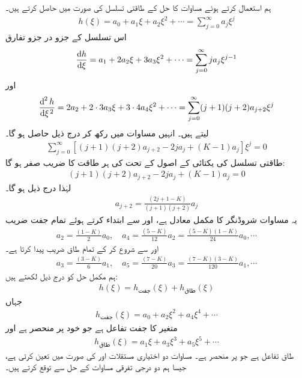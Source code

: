 ہم   استعمال کرتے ہوئے مساوات  کا حل  کے طاقتی تسلسل کی صورت میں حاصل کرتے ہیں۔ 
\begin{align}
h(\xi)=a_{0}+a_{1}\xi+a_{2}\xi^{2}+\cdots = \sum_{j=0}^{\infty}a_{j}\xi^{j}
\end{align}
 اس تسلسل کے جزو در جزو تفارق
\begin{align*}
\frac{\dif{h}}{\dif{\xi}}=a_{1}+2a_{2}\xi+3a_{3}\xi^{2}+\cdots =\sum_{j=0}^{\infty}ja_{j}\xi^{j-1}
\end{align*}
اور
\begin{align*}
\frac{\dif^{\,2}{h}}{\dif{\xi^{\,2}}}=2a_{2}+2\cdot 3a_{3}\xi+3\cdot 4a_{4}\xi^{2}+\cdots =\sum_{j=0}^{\infty}(j+1)(j+2)a_{j+2}\xi^{j}
\end{align*}
لیتے ہیں۔ انہیں مساوات  میں رکھ  کر درج ذیل حاصل ہو گا۔
\begin{align}
\sum_{j=0}^{\infty}[(j+1)(j+2)a_{j+2}-2ja_{j}+(K-1)a_{j}]\xi^{j}=0
\end{align}
طاقتی تسلسل  کی  یکتائی  کے اصول  کے تحت   کی  ہر طاقت کا  ضریب  صفر ہو گا:
\begin{align*}
(j+1)(j+2)a_{j+2}-2ja_{j}+(K-1)a_{j}=0
\end{align*}
لہٰذا درج ذیل ہو گا۔
\begin{align}\label{مساوات_شروڈنگر_کلیہ_توالی_الف}
a_{j+2}=\frac{(2j+1-K)}{(j+1)(j+2)}a_{j}
\end{align}
یہ   مساوات شروڈنگر کا مکمل معادل  ہے، اور   سے ابتداء کرتے ہوئے تمام جفت  ضریب 
\begin{align*}
a_{2}=\frac{(1-K)}{2}a_{0}, \quad a_{4}=\frac{(5-K)}{12}a_{2}=\frac{(5-K)(1-K)}{24}a_{0},\cdots
\end{align*}
اور  سے شروع کر کے تمام طاق  ضریب  پیدا کرتا ہے۔
\begin{align*}
a_{3}=\frac{(3-K)}{6}a_{1},\quad a_{5}=\frac{(7-K)}{20}a_{3}=\frac{(7-K)(3-K)}{120}a_{1},\cdots
\end{align*}
ہم مکمل حل کو درج ذیل لکھتے ہیں:
\begin{align}\label{مساوات_شروڈنگر_کلیہ_توالی_ب}
h(\xi)=h_{\text{جفت}}(\xi)+h_{\text{طاق}}(\xi)
\end{align}
جہاں 
\begin{align*}
h_{\text{جفت}}(\xi)=a_{0}+a_{2}\xi^{2}+a_{4}\xi^{4}+\cdots
\end{align*}
متغیر  کا جفت تفاعل ہے جو خود  پر منحصر ہے اور 
\begin{align*}
h_{\text{طاق}}(\xi)=a_{1}\xi+a_{3}\xi^{3}+a_{5}\xi^{5}+\cdots
\end{align*}
طاق تفاعل ہے جو  پر منحصر ہے۔ مساوات  دو اختیاری مستقلات  اور  کی صورت میں   تعین کرتی ہے، جیسا ہم دو درجی تفرقی مساوات کے حل سے توقع کرتے ہیں۔

